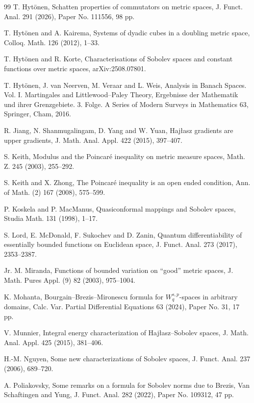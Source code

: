 \documentclass[11pt]{amsart}
\theoremstyle{definition}
\theoremstyle{remark}
\numberwithin{equation}{section}
\begin{document}
\begin{thebibliography}{99}
T. Hyt\"onen,
Schatten properties of commutators on metric spaces,
J. Funct. Anal. 291 (2026), Paper No. 111556, 98 pp.


T. Hyt\"onen and A. Kairema,
Systems of dyadic cubes in a doubling metric space,
Colloq. Math. 126 (2012), 1--33.


T. Hyt\"onen and R. Korte,
Characterisations of Sobolev spaces and constant functions over metric spaces,
arXiv:2508.07801.


T. Hyt\"onen, J. van Neerven, M. Veraar and L. Weis,
Analysis in Banach Spaces. Vol. I. Martingales and Littlewood--Paley Theory,
Ergebnisse der Mathematik und ihrer Grenzgebiete. 3. Folge.
A Series of Modern Surveys in Mathematics 63,
Springer, Cham, 2016.


R. Jiang, N. Shanmugalingam, D. Yang and W. Yuan,
Haj\l asz gradients are upper gradients,
J. Math. Anal. Appl. 422 (2015), 397--407.


S. Keith,
Modulus and the Poincar\'e inequality on metric measure spaces,
Math. Z. 245 (2003), 255--292.


S. Keith and X. Zhong,
The Poincar\'e inequality is an open ended condition,
Ann. of Math. (2) 167 (2008), 575--599.


P. Koskela and P. MacManus,
Quasiconformal mappings and Sobolev spaces,
Studia Math. 131 (1998), 1--17.


S. Lord, E. McDonald, F. Sukochev and D. Zanin,
Quantum differentiability of essentially bounded functions on Euclidean space,
J. Funct. Anal. 273 (2017), 2353--2387.


Jr. M. Miranda,
Functions of bounded variation on ``good'' metric spaces,
J. Math. Pures Appl. (9) 82 (2003), 975--1004.


K. Mohanta,
Bourgain--Brezis--Mironescu formula for $W^{s,p}_q$-spaces in arbitrary domains,
Calc. Var. Partial Differential Equations 63 (2024), Paper No. 31, 17 pp.


V. Munnier,
Integral energy characterization of Haj\l asz--Sobolev spaces,
J. Math. Anal. Appl. 425 (2015), 381--406.


H.-M. Nguyen,
Some new characterizations of Sobolev spaces,
J. Funct. Anal. 237 (2006), 689--720.


A. Poliakovsky,
Some remarks on a formula for Sobolev norms due to Brezis, Van Schaftingen and Yung,
J. Funct. Anal. 282 (2022), Paper No. 109312, 47 pp.



\end{thebibliography}
\end{document}
